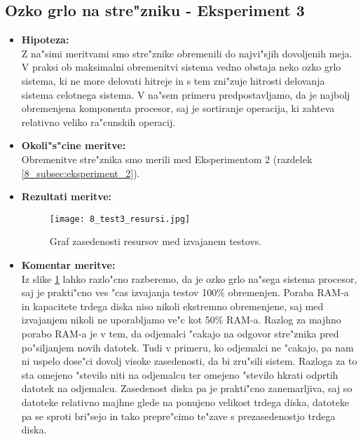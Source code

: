 \newpage
\subsection{Ozko grlo na stre"zniku - Eksperiment 3}
\begin{itemize}
	\item \textbf{Hipoteza: }  \\
		Z na"simi meritvami smo stre"znike obremenili do najvi"sjih dovoljenih meja. V praksi ob maksimalni obremenitvi sistema vedno obstaja neko ozko grlo sistema, ki ne more delovati hitreje in s tem zni"zuje hitrosti delovanja sistema celotnega sistema. V na"sem primeru predpostavljamo, da je najbolj obremenjena komponenta procesor, saj je sortiranje operacija, ki zahteva relativno veliko ra"cunskih operacij.

	\item \textbf{Okoli"s"cine meritve: } \\
		Obremenitve stre"znika smo merili med Eksperimentom 2 (razdelek \ref{8_subsec:eksperiment_2}).

 	\item \textbf{Rezultati meritve: }  \\
		\begin{figure}[!htb]
  		\centering
  		  \texttt{[image: 8\_test3\_resursi.jpg]}
  		\caption{Graf zasedenosti resursov med izvajanem testovs.}
  		\label{8_graf_zasedenost_resursov}
		\end{figure}


	\item \textbf{Komentar meritve: } \\
		Iz slike \ref{8_graf_zasedenost_resursov} lahko razlo"cno razberemo, da je ozko grlo na"sega sistema procesor, saj je prakti"cno ves "cas izvajanja testov 100\% obremenjen. Poraba RAM-a in kapacitete trdega diska niso nikoli ekstremno obremenjene, saj med izvajanjem nikoli ne uporabljamo ve"c kot 50\% RAM-a. Razlog za majhno porabo RAM-a je v tem, da odjemalci "cakajo na odgovor stre"znika pred po"siljanjem novih datotek. Tudi v primeru, ko odjemalci ne "cakajo, pa nam ni uspelo dose"ci dovolj visoke zasedenosti, da bi zru"sili sistem. Razloga za to sta omejeno "stevilo niti na odjemalcu ter omejeno "stevilo hkrati odprtih datotek na odjemalcu. Zasedenost diska pa je prakti"cno zanemarljiva, saj so datoteke relativno majhne glede na ponujeno velikost trdega diska, datoteke pa se sproti bri"sejo in tako prepre"cimo te"zave s prezasedenostjo trdega diska.
\end{itemize}

